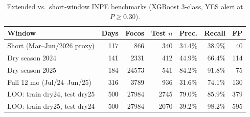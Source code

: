\begin{table}[htbp]
\centering
\caption{Extended vs.\ short-window INPE benchmarks (XGBoost 3-class, YES alert at $P\geq 0.30$).}
\label{tab:extended-temporal}
\small
\begin{tabular}{@{}lrrrrrr@{}}
\toprule
\textbf{Window} & \textbf{Days} & \textbf{Focos} & \textbf{Test $n$} & \textbf{Prec.} & \textbf{Recall} & \textbf{FP} \\
\midrule
Short (Mar--Jun/2026 proxy) & 117 & 866 & 340 & 34.4\% & 38.9\% & 40 \\
Dry season 2024 & 141 & 2331 & 412 & 44.9\% & 66.4\% & 114 \\
Dry season 2025 & 184 & 24573 & 541 & 84.2\% & 91.8\% & 75 \\
Full 12 mo (Jul/24--Jun/25) & 316 & 3789 & 936 & 31.6\% & 74.1\% & 130 \\
LOO: train dry24, test dry25 & 500 & 27984 & 2745 & 79.0\% & 85.9\% & 379 \\
LOO: train dry25, test dry24 & 500 & 27984 & 2070 & 39.2\% & 98.2\% & 595 \\
\bottomrule
\end{tabular}
\end{table}
